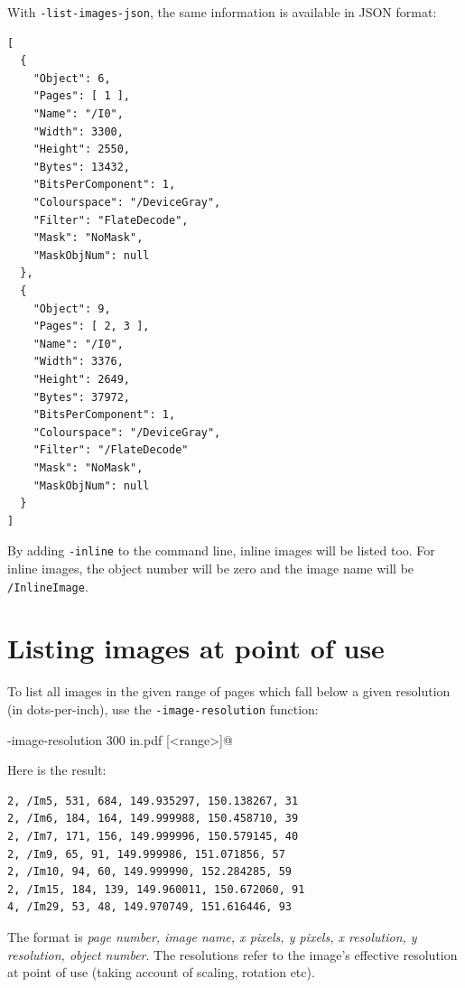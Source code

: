 \documentclass{book}
\begin{document}
With \texttt{-list-images-json}, the same information is available in JSON format:

  \begin{framed}
{\small\begin{verbatim}
[
  {
    "Object": 6,
    "Pages": [ 1 ],
    "Name": "/I0",
    "Width": 3300,
    "Height": 2550,
    "Bytes": 13432,
    "BitsPerComponent": 1,
    "Colourspace": "/DeviceGray",
    "Filter": "FlateDecode",
    "Mask": "NoMask",
    "MaskObjNum": null
  },
  {
    "Object": 9,
    "Pages": [ 2, 3 ],
    "Name": "/I0",
    "Width": 3376,
    "Height": 2649,
    "Bytes": 37972,
    "BitsPerComponent": 1,
    "Colourspace": "/DeviceGray",
    "Filter": "/FlateDecode"
    "Mask": "NoMask",
    "MaskObjNum": null
  }
]\end{verbatim}}
  \end{framed}

By adding \texttt{-inline} to the command line, inline images will be listed too. For inline images, the object number will be zero and the image name will be \texttt{/InlineImage}.

  \section{Listing images at point of use}\label{imageres}
  To list all images in the given range of pages which fall below a given resolution (in dots-per-inch), use the \verb!-image-resolution! function:

  \begin{framed}
  \noindent\small\verb@cpdf -image-resolution 300 in.pdf [<range>]@
  \end{framed}

\noindent Here is the result:

\begin{framed}
{\small\begin{verbatim}
2, /Im5, 531, 684, 149.935297, 150.138267, 31
2, /Im6, 184, 164, 149.999988, 150.458710, 39
2, /Im7, 171, 156, 149.999996, 150.579145, 40
2, /Im9, 65, 91, 149.999986, 151.071856, 57
2, /Im10, 94, 60, 149.999990, 152.284285, 59
2, /Im15, 184, 139, 149.960011, 150.672060, 91
4, /Im29, 53, 48, 149.970749, 151.616446, 93\end{verbatim}}
  \end{framed}

  \noindent The format is \textit{page number, image name, x pixels, y pixels, x resolution, y resolution, object number}. The resolutions refer to the image's effective resolution at point of use (taking account 
of scaling, rotation etc).
\end{document}
